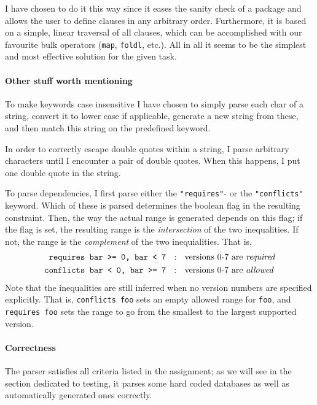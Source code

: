 I have chosen to do it this way since it eases the sanity check of a package and allows the user to define clauses in any arbitrary order. Furthermore, it is based on a simple, linear traversal of all clauses, which can be accomplished with our favourite bulk operators (\texttt{map}, \texttt{foldl}, etc.). All in all it seems to be the simplest and most effective solution for the given task.

\paragraph{Other stuff worth mentioning} To make keywords case insensitive I have chosen to simply parse each char of a string, convert it to lower case if applicable, generate a new string from these, and then match this string on the predefined keyword.

In order to correctly escape double quotes within a string, I parse arbitrary characters until I encounter a pair of double quotes. When this happens, I put one double quote in the string.

To parse dependencies, I first parse either the \texttt{"requires"}- or the \texttt{"conflicts"} keyword. Which of these is parsed determines the boolean flag in the resulting constraint. Then, the way the actual range is generated depends on this flag; if the flag is set, the resulting range is the \textit{intersection} of the two inequalities. If not, the range is the \textit{complement} of the two inequialities. That is,
\begin{align*}
  \texttt{requires bar >= 0, bar < 7}  & \ \ : \ \  \text{versions 0-7 are \it required} \\
  \texttt{conflicts bar < 0, bar >= 7} & \ \ : \ \  \text{versions 0-7 are \it allowed}
\end{align*}
Note that the inequalities are still inferred when no version numbers are specified explicitly. That is, \texttt{conflicts foo} sets an empty allowed range for \texttt{foo}, and \texttt{requires foo} sets the range to go from the smallest to the largest supported version.

\paragraph{Correctness}
\noindent The parser satisfies all criteria listed in the assignment; as we will see in the section dedicated to testing, it parses some hard coded databases as well as automatically generated ones correctly.


